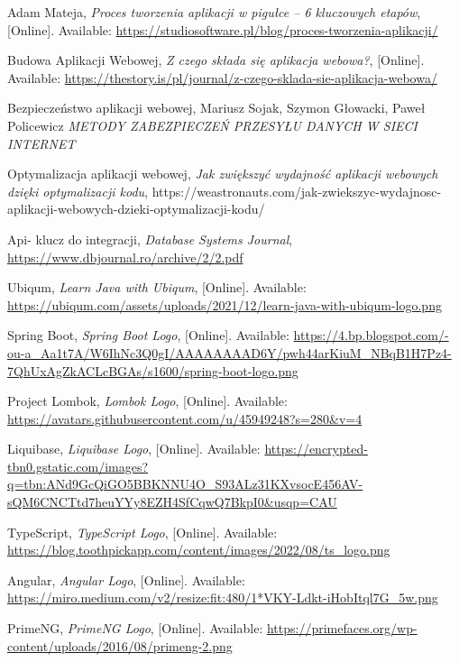 \begin{thebibliography}{99}
\small

Adam Mateja, \emph{Proces tworzenia aplikacji w pigułce – 6 kluczowych etapów}, [Online]. Available: \url{https://studiosoftware.pl/blog/proces-tworzenia-aplikacji/}

Budowa Aplikacji Webowej, \emph{Z czego składa się aplikacja webowa?}, [Online]. Available: \url{https://thestory.is/pl/journal/z-czego-sklada-sie-aplikacja-webowa/}

Bezpieczeństwo aplikacji webowej,  Mariusz Sojak, Szymon Głowacki, Paweł Policewicz \emph{METODY ZABEZPIECZEŃ PRZESYŁU DANYCH
W SIECI INTERNET}

Optymalizacja aplikacji webowej, \emph{Jak zwiększyć wydajność aplikacji webowych dzięki optymalizacji kodu}, https://weastronauts.com/jak-zwiekszyc-wydajnosc-aplikacji-webowych-dzieki-optymalizacji-kodu/

Api- klucz do integracji, \emph{Database Systems Journal}, \url{https://www.dbjournal.ro/archive/2/2.pdf}

Ubiqum, \emph{Learn Java with Ubiqum}, [Online]. Available: \url{https://ubiqum.com/assets/uploads/2021/12/learn-java-with-ubiqum-logo.png}

Spring Boot, \emph{Spring Boot Logo}, [Online]. Available: \url{https://4.bp.blogspot.com/-ou-a_Aa1t7A/W6IhNc3Q0gI/AAAAAAAAD6Y/pwh44arKiuM_NBqB1H7Pz4-7QhUxAgZkACLcBGAs/s1600/spring-boot-logo.png}

Project Lombok, \emph{Lombok Logo}, [Online]. Available: \url{https://avatars.githubusercontent.com/u/45949248?s=280&v=4}

Liquibase, \emph{Liquibase Logo}, [Online]. Available: \url{https://encrypted-tbn0.gstatic.com/images?q=tbn:ANd9GcQiGO5BBKNNU4O_S93ALz31KXvsocE456AV-sQM6CNCTtd7heuYYy8EZH4SfCqwQ7BkpI0&usqp=CAU}

TypeScript, \emph{TypeScript Logo}, [Online]. Available: \url{https://blog.toothpickapp.com/content/images/2022/08/ts_logo.png}

Angular, \emph{Angular Logo}, [Online]. Available: \url{https://miro.medium.com/v2/resize:fit:480/1*VKY-Ldkt-iHobItql7G_5w.png}

PrimeNG, \emph{PrimeNG Logo}, [Online]. Available: \url{https://primefaces.org/wp-content/uploads/2016/08/primeng-2.png}

\end{thebibliography}
